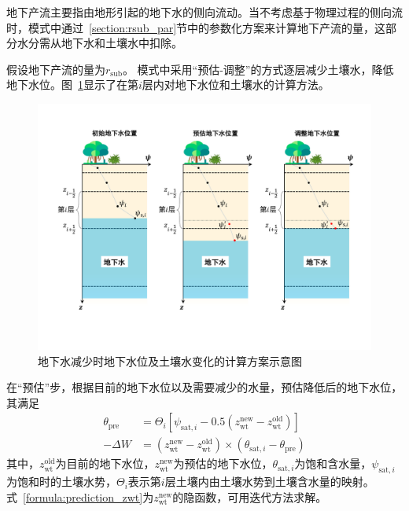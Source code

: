 地下产流主要指由地形引起的地下水的侧向流动。当不考虑基于物理过程的侧向流时，模式中通过~\ref{section:rsub_par}节中的参数化方案来计算地下产流的量，这部分水分需从地下水和土壤水中扣除。

假设地下产流的量为$r_{\mathrm{sub}}$。 模式中采用“预估-调整”的方式逐层减少土壤水，降低地下水位。图~\ref{fig:地下水变化}显示了在第$i$层内对地下水位和土壤水的计算方法。

{
  \begin{figure}[htbp]
    \centering
    \includegraphics[width=\textwidth]{Figures/植被冠层和土壤水分/地下水变化.pdf}
    \caption{地下水减少时地下水位及土壤水变化的计算方案示意图}
    \label{fig:地下水变化}
  \end{figure}
}

在“预估”步，根据目前的地下水位以及需要减少的水量，预估降低后的地下水位，其满足
\begin{equation} \label{formula:prediction_zwt}
  \begin{aligned}
    \theta_{\mathrm{pre}} & = \Theta_i\left[\psi_{\mathrm{sat},i} - 0.5\left(z_{\mathrm{wt}}^{\mathrm{new}} - z_{\mathrm{wt}}^{\mathrm{old}}\right)\right] \\
    - \Delta W & = \left(z_{\mathrm{wt}}^{\mathrm{new}} - z_{\mathrm{wt}}^{\mathrm{old}}\right) \times  \left(\theta_{\mathrm{sat},i} - \theta_{\mathrm{pre}}\right)
  \end{aligned}
\end{equation}
其中，$z_{\mathrm{wt}}^{\mathrm{old}}$为目前的地下水位，$z_{\mathrm{wt}}^{\mathrm{new}}$为预估的地下水位，$\theta_{\mathrm{sat},i}$为饱和含水量，$\psi_{\mathrm{sat},i}$为饱和时的土壤水势，$\Theta_i$表示第$i$层土壤内由土壤水势到土壤含水量的映射。式~\eqref{formula:prediction_zwt}为$z_{\mathrm{wt}}^{\mathrm{new}}$的隐函数，可用迭代方法求解。

